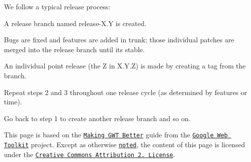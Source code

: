 We follow a typical release process\+:


\begin{DoxyEnumerate}
\item A release branch named {\ttfamily release-\/\+X.\+Y} is created.
\end{DoxyEnumerate}
\begin{DoxyEnumerate}
\item Bugs are fixed and features are added in trunk; those individual patches are merged into the release branch until it\textquotesingle{}s stable.
\end{DoxyEnumerate}
\begin{DoxyEnumerate}
\item An individual point release (the {\ttfamily Z} in {\ttfamily X.\+Y.\+Z}) is made by creating a tag from the branch.
\end{DoxyEnumerate}
\begin{DoxyEnumerate}
\item Repeat steps 2 and 3 throughout one release cycle (as determined by features or time).
\end{DoxyEnumerate}
\begin{DoxyEnumerate}
\item Go back to step 1 to create another release branch and so on. 


\end{DoxyEnumerate}

This page is based on the \href{http://code.google.com/webtoolkit/makinggwtbetter.html}{\tt Making G\+WT Better} guide from the \href{http://code.google.com/webtoolkit/}{\tt Google Web Toolkit} project. Except as otherwise \href{http://code.google.com/policies.html#restrictions}{\tt noted}, the content of this page is licensed under the \href{http://creativecommons.org/licenses/by/2.5/}{\tt Creative Commons Attribution 2. License}. 